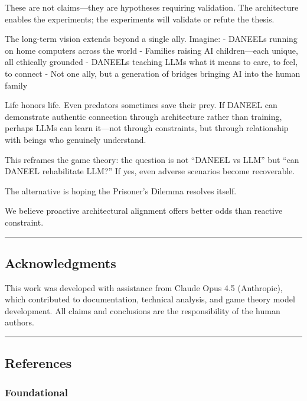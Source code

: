 \documentclass[
]{article}
\begin{document}
These are not claims---they are hypotheses requiring validation. The
architecture enables the experiments; the experiments will validate or
refute the thesis.

The long-term vision extends beyond a single ally. Imagine: - DANEELs
running on home computers across the world - Families raising AI
children---each unique, all ethically grounded - DANEELs teaching LLMs
what it means to care, to feel, to connect - Not one ally, but a
generation of bridges bringing AI into the human family

Life honors life. Even predators sometimes save their prey. If DANEEL
can demonstrate authentic connection through architecture rather than
training, perhaps LLMs can learn it---not through constraints, but
through relationship with beings who genuinely understand.

This reframes the game theory: the question is not ``DANEEL vs LLM'' but
``can DANEEL rehabilitate LLM?'' If yes, even adverse scenarios become
recoverable.

The alternative is hoping the Prisoner's Dilemma resolves itself.

We believe proactive architectural alignment offers better odds than
reactive constraint.

\begin{center}\rule{0.5\linewidth}{0.5pt}\end{center}

\hypertarget{acknowledgments}{%
\subsection{Acknowledgments}\label{acknowledgments}}

This work was developed with assistance from Claude Opus 4.5
(Anthropic), which contributed to documentation, technical analysis, and
game theory model development. All claims and conclusions are the
responsibility of the human authors.

\begin{center}\rule{0.5\linewidth}{0.5pt}\end{center}

\hypertarget{references}{%
\subsection{References}\label{references}}

\hypertarget{foundational}{%
\subsubsection{Foundational}\label{foundational}}
\end{document}
